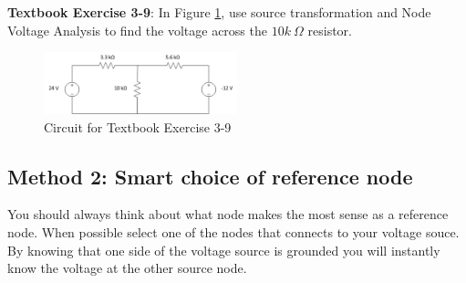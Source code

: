 \documentclass{handout}
\begin{document}
\textbf{Textbook Exercise 3-9}: In Figure \ref{fig: TextbookExercise3-9}, use source transformation and Node Voltage Analysis to find the voltage across the $10k\ \Omega$ resistor.
\begin{figure} [h t b]
\centering
\includegraphics[width=0.5\textwidth]{TextbookExercise3-9.jpg}
\caption{Circuit for Textbook Exercise 3-9}
\label{fig: TextbookExercise3-9}
\end{figure}


\newpage
\pagebreak
\clearpage

\subsection{Method 2: Smart choice of reference node}
You should always think about what node makes the most sense as a reference node.  When possible select one of the nodes that connects to your voltage souce.  By knowing that one side of the voltage source is grounded you will instantly know the voltage at the other source node.  
\end{document}
